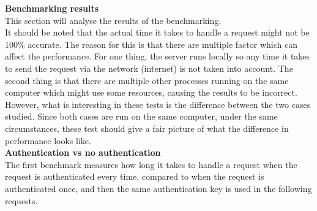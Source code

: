 \documentclass[12pt,a4paper]{article}
\begin{document}
\textbf{Benchmarking results}\\
This section will analyse the results of the benchmarking.\\
It should be noted that the actual time it takes to handle a request might not be 100\% accurate. The reason for this is that there are multiple factor which can affect the performance. For one thing, the server runs locally so any time it takes to send the request via the network (internet) is not taken into account. The second thing is that there are multiple other processes running on the same computer which might use some resources, causing the results to be incorrect. However, what is interesting in these tests is the difference between the two cases studied. Since both cases are run on the same computer, under the same circumstances, these test should give a fair picture of what the difference in performance looks like.\\

\newpage
\textbf{Authentication vs no authentication}\\
The first benchmark measures how long it takes to handle a request when the request is authenticated every time, compared to when the request is authenticated once, and then the same authentication key is used in the following requests.
\end{document}
